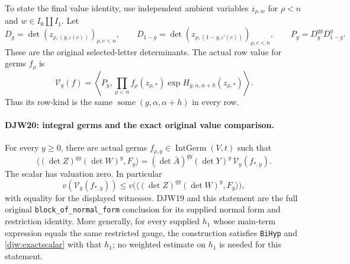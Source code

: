 To state the final value identity, use independent ambient variables
$z_{\rho,w}$ for $\rho<n$ and $w\in I_0\amalg I_1$.
Let
\[
 D_g=\det(z_{\rho,(g,\iota(c))})_{\rho,c<n},\qquad
 D_{1-g}=\det(z_{\rho,(1-g,\iota'(c))})_{\rho,c<n},
 \qquad P_y=D_g^{qy}D_{1-g}^{y}.
\]
These are the original selected-letter determinants.  The actual
row value for germs $f_\rho$ is
\begin{equation}
 \mathcal V_y(f)=
 \left\langle P_y,
  \prod_{\rho<n}f_\rho(z_{\rho,*})
              \exp H_{g,\alpha,\alpha+h}(z_{\rho,*})\right\rangle.
 \label{djw:actualvalue}
\end{equation}
Thus its row-kind is the same
$\operatorname{some}(g,\alpha,\alpha+h)$ in every row.

\paragraph{DJW20: integral germs and the exact original value comparison.}
\label{claim:DJW20}
For every $y\ge0$, there are actual germs
$f_{\rho,y}\in\operatorname{IntGerm}(V,t)$ such that
\begin{equation}
 \langle(\det Z)^{qy}(\det W)^y,F_y\rangle
   = (\det\bar A)^{qy}(\det Y)^y\,
                     \mathcal V_y(f_{*,y}).
 \label{djw:exactscalar}
\end{equation}
The scalar has valuation zero.  In particular
\begin{equation}
 v(\mathcal V_y(f_{*,y}))
 \le v\bigl(\langle(\det Z)^{qy}(\det W)^y,F_y\rangle\bigr),
 \label{djw:actualcomparison}
\end{equation}
with equality for the displayed witnesses.  DJW19 and this statement
are the full original \texttt{block\_of\_normal\_form} conclusion
for its supplied normal form and restriction identity.
More generally, for every supplied $h_1$ whose main-term expression
equals the same restricted gauge, the construction satisfies
\texttt{BiHyp} and \eqref{djw:exactscalar} with that $h_1$;
no weighted estimate on $h_1$ is needed for this statement.

